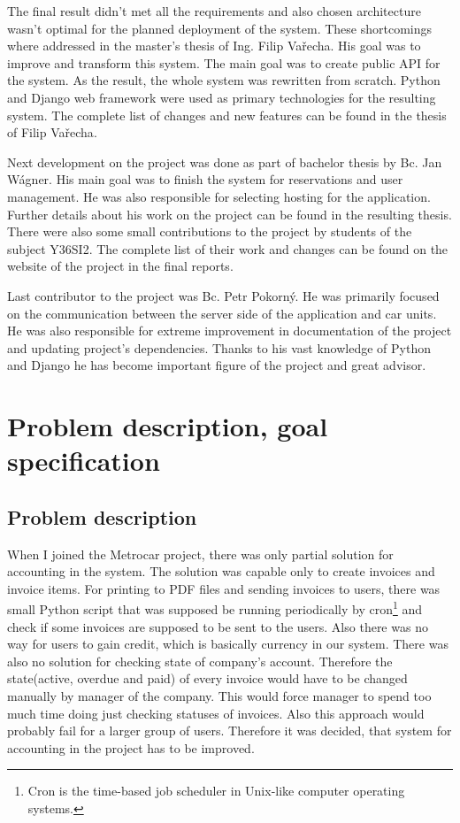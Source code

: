 \documentclass[11pt,twoside,a4paper]{book}
\begin{document}
The final result didn't met all the requirements and also chosen architecture
wasn't optimal for the planned deployment of  the system. These shortcomings
where addressed in the master's thesis of Ing. Filip Vařecha. His goal was to
improve and transform this system.  The main goal was to create public API for
the system. As the result, the whole system was rewritten  from scratch.
Python and Django web framework were used as primary technologies for the
resulting system. The complete list  of changes and new features can be found
in the thesis of Filip Vařecha\cite{Varech10}. 

Next development on the project was done as part of bachelor thesis by Bc. Jan Wágner. His main goal was to 
finish the system for reservations and user management. He was also responsible for selecting hosting for the application. 
Further details about his work on the project can be found in the resulting thesis\cite{WagneJan}. There were also some 
small contributions to the project by students of the subject Y36SI2. The complete list of their work and changes can be found on the website of the project in the final reports\cite{assembla}. 

Last contributor to the project was Bc. Petr Pokorný. He was primarily focused on the communication between the server side of the application and car units. He was also responsible for extreme improvement in documentation of the project and updating 
project's dependencies. Thanks to his vast knowledge of Python and Django he has become important figure of the project 
and great advisor. 

\chapter{Problem description, goal specification}
\section{Problem description}
When I joined the Metrocar project, there was only partial solution for accounting in the system. The solution was capable only to create invoices and invoice items. For printing to PDF files and sending invoices to users, there was small Python script that was supposed be running periodically by cron\footnote{Cron is the time-based job scheduler in Unix-like computer operating systems.} and check if some invoices are supposed to be sent to the users. Also there was no way for users to gain credit, which is basically currency in our system. There was also no solution for checking 
state of company's account. Therefore the state(active, overdue and paid) of every invoice would have to be changed manually by manager of the company. This would force manager to spend too much time doing just checking statuses of invoices. Also this 
approach would probably fail for a larger group of users. Therefore it was decided, that system for accounting in the project 
has to be improved.
\end{document}
